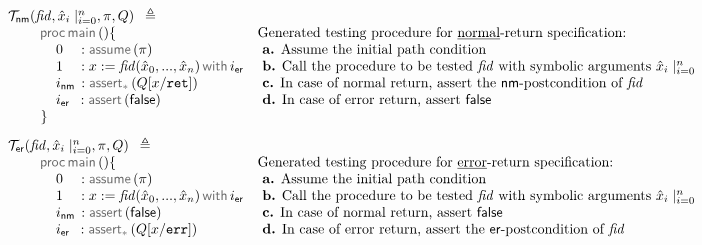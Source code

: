 \begin{figure*}
\begin{center}
$$
\begin{array}{ll}
\testify{\fnormal}(\fid, \svar_i\mid_{i=0}^n, \pc, Q) \ \semeq & \\
         \dspc \dspc  \darkmath{\sf proc} \jsilmain () \{ 
         &  \text{Generated testing procedure for \underline{normal}-return specification:} \\ 
             \dspc \dspc \dspc 0_{\phantom{\sf nm}}:  \assume(\pc) 
                   & \text{  {\bf a.} Assume the initial path condition} \\ 
             \dspc \dspc \dspc 1_{\phantom{\sf nm}}: \jsilcall{\jvar}{\fid}{\svar_0, ..., \svar_n}{\procerrlab}  
                   & \text{  {\bf b.} Call the procedure to be tested $\fid$ with symbolic arguments $\svar_i\mid_{i=0}^n$} \\ 
             \dspc \dspc \dspc \procretlab \, : \sepassert(Q[\jvar/\procretvar])
                  & \text{  {\bf c.}  In case of normal return, assert the $\fnormal$-postcondition of $\fid$} \\ 
             \dspc \dspc \dspc \procerrlab \, \, \, : \assert(\jfalse)
                  & \text{  {\bf d.}  In case of error return, assert $\jfalse$} \\ 
         \ \ \ \ \ \ \ \} &\\[8pt]
%
\testify{\ferror}(\fid, \svar_i\mid_{i=0}^n, \pc, Q) \ \semeq & \\
         \dspc \dspc  \darkmath{\sf proc} \jsilmain () \{ 
         &  \text{Generated testing procedure for \underline{error}-return specification:} \\ 
            \dspc \dspc \dspc 0_{\phantom{\sf nm}}:  \assume(\pc)   
                   & \text{  {\bf a.} Assume the initial path condition} \\ 
             \dspc \dspc \dspc 1_{\phantom{\sf nm}}: \jsilcall{\jvar}{\fid}{\svar_0, ..., \svar_n}{\procerrlab}  
                   & \text{  {\bf b.} Call the procedure to be tested $\fid$ with symbolic arguments $\svar_i\mid_{i=0}^n$} \\ 
             \dspc \dspc \dspc \procretlab \, : \assert(\jfalse)
                  & \text{  {\bf c.}  In case of normal return, assert $\jfalse$} \\ 
             \dspc \dspc \dspc \procerrlab \, \, \, : \sepassert(Q[\jvar/\procerrvar])
                  & \text{  {\bf d.}  In case of error return,  assert the $\ferror$-postcondition of $\fid$} \\ 

\end{array}$$
\end{center}
\end{figure*}
